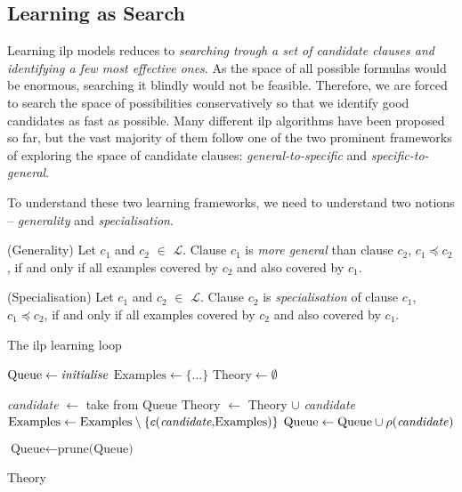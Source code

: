 \subsection{Learning as Search}

Learning \gls{ilp} models reduces to \textit{searching trough a set of candidate clauses and identifying a few most effective ones}.
As the space of all possible formulas would be enormous, searching it blindly would not be feasible.
Therefore, we are forced to search the space of possibilities conservatively so that we identify good candidates as fast as possible.
Many different \gls{ilp} algorithms have been proposed so far, but the vast majority of them follow one of the two prominent frameworks of exploring the space of candidate clauses: \textit{general-to-specific} and \textit{specific-to-general}.



To understand these two learning frameworks, we need to understand two notions -- \textit{generality} and \textit{specialisation}.

\begin{definition}{(Generality)}
Let $c_1$ and $c_2$ $\in$ $\mathcal{L}$.
Clause $c_1$ is \textit{more general} than clause $c_2$, $c_1 \preceq c_2$, if and only if all examples covered by $c_2$ and also covered by $c_1$.
\end{definition}



\begin{definition}{(Specialisation)}
Let $c_1$ and $c_2$ $\in$ $\mathcal{L}$.
Clause $c_2$ is \textit{specialisation} of clause $c_1$, $c_1 \preceq c_2$, if and only if all examples covered by $c_2$ and also covered by $c_1$.
\end{definition}




\begin{algorithm}

	\caption{The \gls{ilp} learning loop}
	\begin{algorithmic}
		\STATE $\text{Queue} \leftarrow \text{\textit{initialise}}$
		\STATE $\text{Examples} \leftarrow \{\text{\ldots}\}$
		\STATE $\text{Theory} \leftarrow \emptyset$

			\STATE \textit{candidate} $\leftarrow$ take from Queue
				\STATE Theory $\leftarrow$ Theory $\cup$ \textit{candidate}
				\STATE $\text{Examples} \leftarrow \text{Examples} \setminus \{c(\text{\textit{candidate},Examples})\}$
			\ELSE
				\STATE $\text{Queue} \leftarrow \text{Queue} \cup \rho(\text{\textit{candidate}})$
			\ENDIF

			\STATE $\text{Queue} \leftarrow \text{prune(Queue)}$

		\ENDWHILE
		\RETURN Theory

	\end{algorithmic}
	\label{alg:ilploop}
\end{algorithm}


